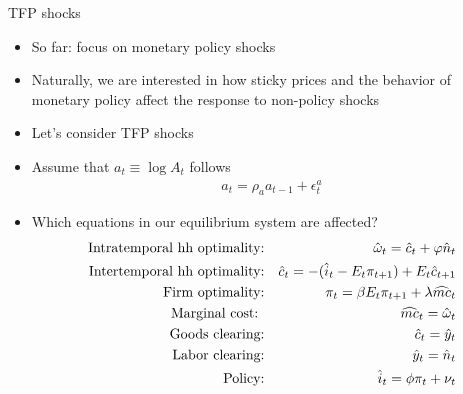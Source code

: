 \documentclass[9pt,xcolor={dvipsnames}]{beamer}
\newcommand{\bit}{\begin{itemize}}
\newcommand{\eit}{\end{itemize}}
\newcommand{\black}{\color{black}}
\begin{document}
\begin{frame}{TFP shocks}

\bit
\setlength\itemsep{1em}
\item So far: focus on monetary policy shocks

\item Naturally, we are interested in how sticky prices and the behavior of monetary policy affect the response to non-policy shocks

\item Let's consider TFP shocks

\item Assume that $a_t \equiv \log A_t$ follows
\begin{eqnarray}
a_t = \rho_a a_{t-1} + \epsilon^a_t \nonumber
\end{eqnarray}

\item Which equations in our equilibrium system are affected?
\begin{eqnarray}
\text{Intratemporal hh optimality:} && \hat \omega_t = \hat c_t + \varphi \hat n_t  \nonumber \\
\text{Intertemporal hh optimality:} && \hat c_t =  - (\hat i_t - E_t \pi_{t+1} ) + E_t \hat c_{t+1}  \nonumber \\
\text{Firm optimality:} && \pi_t = \beta E_t \pi_{t+1} + \lambda \widehat{mc}_t \nonumber \\
\text{{\black Marginal cost:} } && {\black \widehat{mc}_t = \hat \omega_t}  \nonumber \\
\text{Goods clearing:} && \hat c_t = \hat y_t \nonumber \\
\text{{\black Labor clearing:}} && {\black \hat y_t = \hat n_t} \nonumber \\
\text{Policy:} && \hat i_t = \phi \pi_t + \nu_t \nonumber 
\end{eqnarray}

\eit


\end{frame}
\end{document}
